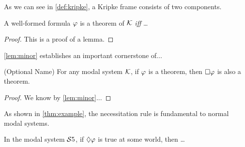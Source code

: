 \documentclass[11pt, a4paper]{article}  %
\begin{document}
\noindent
As we can see in \ref{def:kripke}, a Kripke frame consists of two components.





\begin{Lthm} \label{lem:minor} %
  A well-formed formula $\varphi$ is a theorem of $\mathcal{K}$ \textit{iff} \ldots
\end{Lthm}

\begin{proof}
  This is a proof of a lemma.

\end{proof}

\ref{lem:minor} establishes an important cornerstone of...





\begin{Tthm}{(Optional Name)} \label{thm:example} %
  For any modal system $\mathcal{K}$, if $\varphi$ is a theorem, then $\Box\varphi$ is also a theorem.
\end{Tthm}

\begin{proof}
  We know by \ref{lem:minor}...

\end{proof}

As shown in \ref{thm:example}, the necessitation rule is fundamental to normal modal systems.





\begin{Cthm} \label{cor:s5}
  In the modal system $\mathcal{S}5$, if $\Diamond\varphi$ is true at some world, then \ldots
\end{Cthm}




\end{document}
